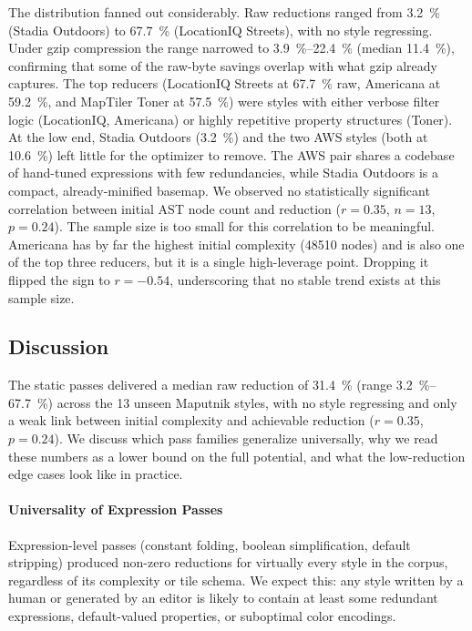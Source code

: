The distribution fanned out considerably.
Raw reductions ranged from \qty{3.2}{\percent} (Stadia Outdoors) to \qty{67.7}{\percent} (LocationIQ Streets), with no style regressing.
Under gzip compression the range narrowed to \qtyrange{3.9}{22.4}{\percent} (median \qty{11.4}{\percent}), confirming that some of the raw-byte savings overlap with what gzip already captures.
The top reducers (LocationIQ Streets at \qty{67.7}{\percent} raw, Americana at \qty{59.2}{\percent}, and MapTiler Toner at \qty{57.5}{\percent}) were styles with either verbose filter logic (LocationIQ, Americana) or highly repetitive property structures (Toner).
At the low end, Stadia Outdoors (\qty{3.2}{\percent}) and the two AWS styles (both at \qty{10.6}{\percent}) left little for the optimizer to remove.
The AWS pair shares a codebase of hand-tuned expressions with few redundancies, while Stadia Outdoors is a compact, already-minified basemap.
We observed no statistically significant correlation between initial \ac{AST} node count and reduction ($r = 0.35$, $n = 13$, $p = 0.24$).
The sample size is too small for this correlation to be meaningful.  Americana has by far the highest initial complexity (\num{48510} nodes) and is also one of the top three reducers, but it is a single high-leverage point.
Dropping it flipped the sign to $r = -0.54$, underscoring that no stable trend exists at this sample size.

\subsection{Discussion}\label{sub:cross_discussion}

The static passes delivered a median raw reduction of \qty{31.4}{\percent} (range \qtyrange{3.2}{67.7}{\percent}) across the 13 unseen Maputnik styles, with no style regressing and only a weak link between initial complexity and achievable reduction ($r = 0.35$, $p = 0.24$).
We discuss which pass families generalize universally, why we read these numbers as a lower bound on the full potential, and what the low-reduction edge cases look like in practice.

\paragraph{Universality of Expression Passes}
Expression-level passes (constant folding, boolean simplification, default stripping) produced non-zero reductions for virtually every style in the corpus, regardless of its complexity or tile schema.
We expect this: any style written by a human or generated by an editor is likely to contain at least some redundant expressions, default-valued properties, or suboptimal color encodings.


